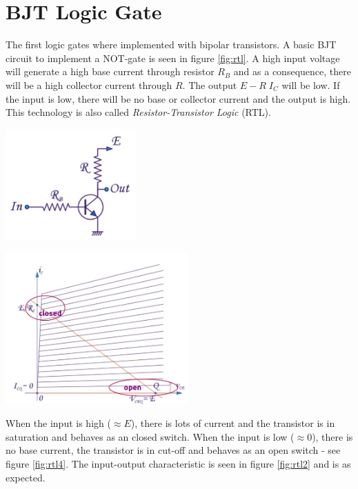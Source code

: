 \section{BJT Logic Gate}
The first logic gates where implemented with bipolar transistors. A basic BJT circuit to implement a NOT-gate is seen in figure \ref{fig:rtl}. A high input voltage will generate a high base current through resistor $R_B$ and as a consequence, there will be a high collector current through $R$. The output $E - R\;I_C$ will be low. If the input is low, there will be no base or collector current and the output is high. This technology is also called \emph{Resistor-Transistor Logic} (RTL).\\
\begin{minipage}{.5\textwidth}
	\centering
	\includegraphics[width=5cm]{figures/ch15/rtl.jpg}
	\label{fig:rtl}
\end{minipage}%
\begin{minipage}{.5\textwidth}
	\centering
	\includegraphics[width=7cm]{figures/ch15/rtl4.jpg}
	\label{fig:rtl4}
\end{minipage}

When the input is high ($\approx E$), there is lots of current and the transistor is in saturation and behaves as an closed switch. When the input is low ($\approx 0$), there is no base current, the transistor is in cut-off and behaves as an open switch - see figure \ref{fig:rtl4}. The input-output characteristic is seen in figure \ref{fig:rtl2} and is as expected.


